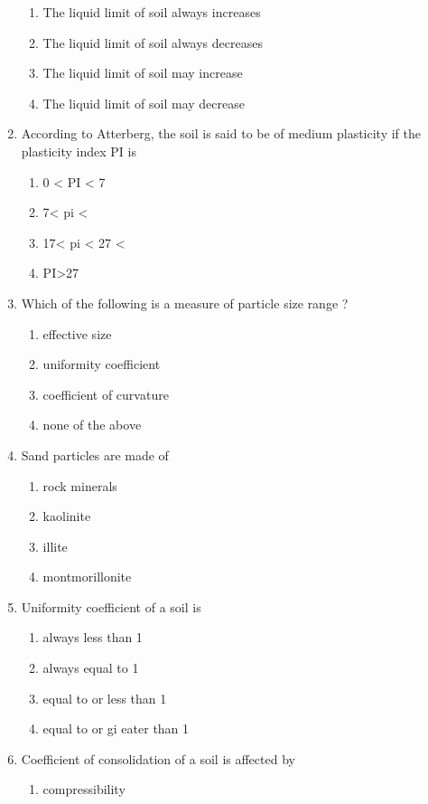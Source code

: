 \documentclass[11pt,a4paper]{article}
\begin{document}
\begin{enumerate}
\begin{enumerate}[label=\Alph*.]
\item{The liquid limit of soil always increases}
\item{The liquid limit of soil always decreases}
\item{The liquid limit of soil may increase}
\item{The liquid limit of soil may decrease}
\end{enumerate}
\item{According to Atterberg, the soil is said to be of medium plasticity if the plasticity index PI is}
\begin{enumerate}[label=\Alph*.]
\item{0 < PI < 7}
\item{7< pi <}
\item{17< pi < 27 <}
\item{PI>27}
\end{enumerate}
\item{Which of the following is a measure of particle size range ?}
\begin{enumerate}[label=\Alph*.]
\item{effective size}
\item{uniformity coefficient}
\item{coefficient of curvature}
\item{none of the above}
\end{enumerate}
\item{Sand particles are made of}
\begin{enumerate}[label=\Alph*.]
\item{rock minerals}
\item{kaolinite}
\item{illite}
\item{montmorillonite}
\end{enumerate}
\item{Uniformity coefficient of a soil is}
\begin{enumerate}[label=\Alph*.]
\item{always less than 1}
\item{always equal to 1}
\item{equal to or less than 1}
\item{equal to or gi eater than 1}
\end{enumerate}
\item{Coefficient of consolidation of a soil is affected by}
\begin{enumerate}[label=\Alph*.]
\item{compressibility}

\end{enumerate}
\end{enumerate}
\end{document}
